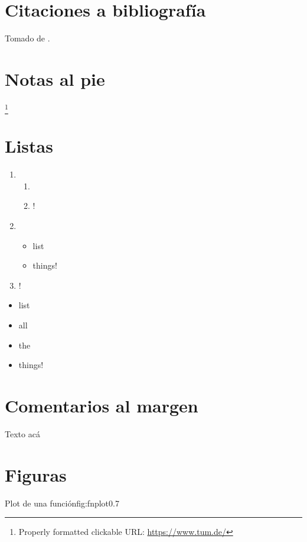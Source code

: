 
\section*{Citaciones a bibliografía}
\tinylipsum Tomado de \cite{latex}.

\section*{Notas al pie}
\tinylipsum \footnote{Properly formatted clickable URL: \url{https://www.tum.de/}}

\section*{Listas}
\tinylipsum

\tinylipsum
\begin{enumerate}
  \item \tinylipsum
    \begin{enumerate}
      \item \tinylipsum
      \item \tinylipsum!
    \end{enumerate}
  \item \tinylipsum
    \begin{itemize}
      \item list
      \item things!
    \end{itemize}
  \item \tinylipsum!
\end{enumerate}

\begin{itemize}
  \item list
  \item all
  \item the
  \item things!
\end{itemize}
\tinylipsum

\section*{Comentarios al margen}
Texto acá  \tinylipsum

\section*{Figuras}
\tinylipsum
{}%
{Plot de una función}{fig:fnplot}{0.7}
\tinylipsum

